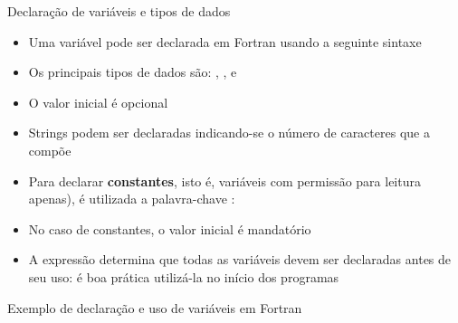 \begin{frame}[fragile]{Declaração de variáveis e tipos de dados}

    \begin{itemize}
        \item Uma variável pode ser declarada em Fortran usando a seguinte sintaxe


        \item Os principais tipos de dados são: , 
            ,  e 
        
        \item O valor inicial é opcional

        \item Strings podem ser declaradas indicando-se o número de caracteres que a compõe


        \item Para declarar \textbf{constantes}, isto é, variáveis com permissão para leitura
            apenas), é utilizada a palavra-chave :

    
        \item No caso de constantes, o valor inicial é mandatório

        \item A expressão  determina que todas as variáveis devem
            ser declaradas antes de seu uso: é boa prática utilizá-la no início dos programas
    \end{itemize}

\end{frame}

\begin{frame}[fragile]{Exemplo de declaração e uso de variáveis em Fortran}
\end{frame}

